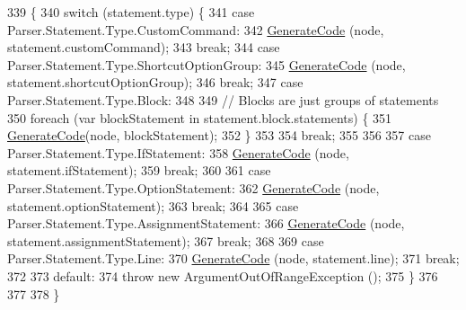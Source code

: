 \begin{DoxyCode}
339                                                                  \{
340             \textcolor{keywordflow}{switch} (statement.type) \{
341             \textcolor{keywordflow}{case} Parser.Statement.Type.CustomCommand:
342                 \hyperlink{a00043_a006f3becd521cc179ba3d3352f6f930b}{GenerateCode} (node, statement.customCommand);
343                 \textcolor{keywordflow}{break};
344             \textcolor{keywordflow}{case} Parser.Statement.Type.ShortcutOptionGroup:
345                 \hyperlink{a00043_a006f3becd521cc179ba3d3352f6f930b}{GenerateCode} (node, statement.shortcutOptionGroup);
346                 \textcolor{keywordflow}{break};
347             \textcolor{keywordflow}{case} Parser.Statement.Type.Block:
348                 
349                 \textcolor{comment}{// Blocks are just groups of statements}
350                 \textcolor{keywordflow}{foreach} (var blockStatement \textcolor{keywordflow}{in} statement.block.statements) \{
351                     \hyperlink{a00043_a006f3becd521cc179ba3d3352f6f930b}{GenerateCode}(node, blockStatement);
352                 \}
353 
354                 \textcolor{keywordflow}{break};
355 
356 
357             \textcolor{keywordflow}{case} Parser.Statement.Type.IfStatement:
358                 \hyperlink{a00043_a006f3becd521cc179ba3d3352f6f930b}{GenerateCode} (node, statement.ifStatement);
359                 \textcolor{keywordflow}{break};
360 
361             \textcolor{keywordflow}{case} Parser.Statement.Type.OptionStatement:
362                 \hyperlink{a00043_a006f3becd521cc179ba3d3352f6f930b}{GenerateCode} (node, statement.optionStatement);
363                 \textcolor{keywordflow}{break};
364 
365             \textcolor{keywordflow}{case} Parser.Statement.Type.AssignmentStatement:
366                 \hyperlink{a00043_a006f3becd521cc179ba3d3352f6f930b}{GenerateCode} (node, statement.assignmentStatement);
367                 \textcolor{keywordflow}{break};
368 
369             \textcolor{keywordflow}{case} Parser.Statement.Type.Line:
370                 \hyperlink{a00043_a006f3becd521cc179ba3d3352f6f930b}{GenerateCode} (node, statement.line);
371                 \textcolor{keywordflow}{break};
372 
373             \textcolor{keywordflow}{default}:
374                 \textcolor{keywordflow}{throw} \textcolor{keyword}{new} ArgumentOutOfRangeException ();
375             \}
376 
377 
378         \}
\end{DoxyCode}
